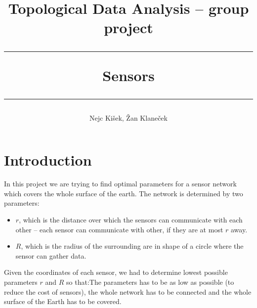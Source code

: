 \documentclass[a4paper, 12pt]{article}
\title{
{\large Topological Data Analysis -- group project} \\
	\vspace{3mm}
	\hrule
	\vspace{3mm}
Sensors
	\vspace{3mm}
	\hrule
}
\author{
	Nejc Ki\v sek,
	\v Zan Klane\v cek
}
\begin{document}
\maketitle


\section{Introduction}
In this project we are trying to find optimal parameters for a sensor network which covers the whole surface of the earth. The network is determined by two parameters: 
\begin{itemize}
	\item \textbf{$r$}, which is the distance over which the sensors can communicate with each other -- each sensor can communicate with other, if they are at most $r$ away.
	\item \textbf{$R$}, which is the radius of the surrounding are in shape of a circle where the sensor can gather data.
\end{itemize}

Given the coordinates of each sensor, we had to determine lowest possible parameters $r$ and $R$ so that:The parameters has to be as low as possible (to reduce the cost of sensors), the whole network has to be connected and the whole surface of the Earth has to be covered.
\end{document}
